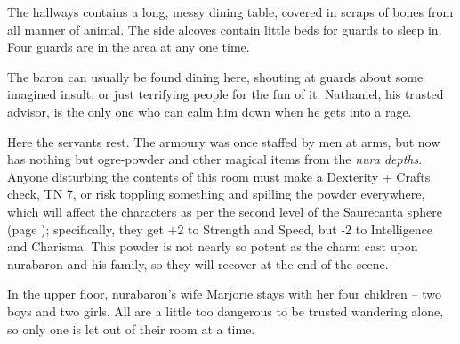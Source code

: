 The hallways contains a long, messy dining table, covered in scraps of bones from all manner of animal.  The side alcoves contain little beds for guards to sleep in.  Four guards are in the area at any one time.

The baron can usually be found dining here, shouting at guards about some imagined insult, or just terrifying people for the fun of it.  Nathaniel, his trusted advisor, is the only one who can calm him down when he gets into a rage.




Here the servants rest.  The armoury was once staffed by men at arms, but now has nothing but ogre-powder and other magical items from the \textit{nura depths}.  Anyone disturbing the contents of this room must make a Dexterity + Crafts check, TN 7, or risk toppling something and spilling the powder everywhere, which will affect the characters as per the second level of the Saurecanta sphere (page \pageref{saurecanta}); specifically, they get +2 to Strength and Speed, but -2 to Intelligence and Charisma.  This powder is not nearly so potent as the charm cast upon \gls{nurabaron} and his family, so they will recover at the end of the scene.

In the upper floor, \gls{nurabaron}'s wife Marjorie stays with her four children -- two boys and two girls.  All are a little too dangerous to be trusted wandering alone, so only one is let out of their room at a time.


\ogre


